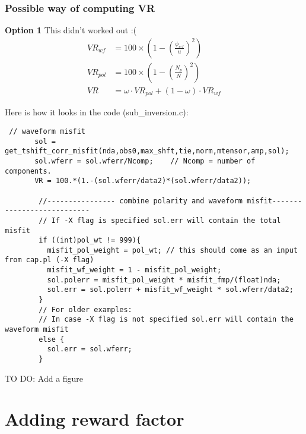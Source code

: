 \documentclass[11pt,titlepage,fleqn]{article}
\begin{document}
\subsubsection*{Possible way of computing VR}
{\bf Option 1} This didn't worked out :( 
\begin{align*}
VR_{wf} &= 100 \times \left( 1 - \left (\frac{\phi_{wf}}{u} \right)^2 \right) \\
VR_{pol} &= 100 \times \left( 1 - \left ( \frac{N_p}{N} \right) ^2 \right ) \\
VR &=  \omega \cdot VR_{pol} + (1 - \omega) \cdot VR_{wf}
\end{align*}


Here is how it looks in the code (sub\_inversion.c):
\begin{verbatim}
 // waveform misfit
       sol = get_tshift_corr_misfit(nda,obs0,max_shft,tie,norm,mtensor,amp,sol);
       sol.wferr = sol.wferr/Ncomp;    // Ncomp = number of components.
       VR = 100.*(1.-(sol.wferr/data2)*(sol.wferr/data2));

	    //---------------- combine polarity and waveform misfit---------------------------
	    // If -X flag is specified sol.err will contain the total misfit
	    if ((int)pol_wt != 999){
	      misfit_pol_weight = pol_wt; // this should come as an input from cap.pl (-X flag)
	      misfit_wf_weight = 1 - misfit_pol_weight;
	      sol.polerr = misfit_pol_weight * misfit_fmp/(float)nda;
	      sol.err = sol.polerr + misfit_wf_weight * sol.wferr/data2;
	    }
	    // For older examples:
	    // In case -X flag is not specified sol.err will contain the waveform misfit
	    else { 
	      sol.err = sol.wferr;
	    }
\end{verbatim}

TO DO: Add a figure

\section{Adding reward factor}
\end{document}

